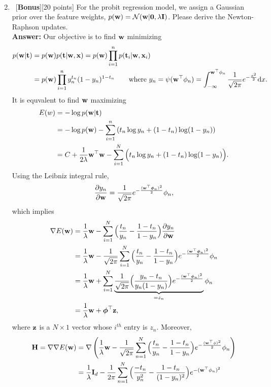 \documentclass[12pt, fullpage,letterpaper]{article}
\def\red{\color{red}}
\def\blackblue{\color{black!40!blue}}
\begin{document}
\begin{enumerate}
{\begin{align*}
	\end{align*} 
	}
\item~[\textbf{Bonus}][20 points]  For the probit regression model, we assign a Gaussian prior over the feature weights,  $p({\bf w}) = \mathcal{N}({\bf w}|{\bf 0}, \lambda{\bf I})$. Please derive the Newton-Raphson updates. \\
	{\bf \red Answer:} {\blackblue Our objective is to find ${\bf w}$ minimizing 
	\begin{align*}
	p({\bf w}|{\bf t}) & = p({\bf w}) p({\bf t}|{\bf w},{\bf x}) = p({\bf w})\prod_{i=1}^n p({\bf t}_i|{\bf w},{\bf x}_i)\\
	& = p({\bf w})\prod_{i=1}^n  y_n^{t_n}(1-y_n)^{1-t_n}\quad\quad\text{where $y_n = \psi({\bf w}^\top \phi_n)=\int_{-\infty}^{{\bf w}^\top \phi_n}\frac{1}{\sqrt{2\pi}}e^{-\frac{x^2}{2}}{\rm d} x.$}
	\end{align*}
	It is equvalent to find ${\bf w}$ maximizing 
	\begin{align*}
	E(w) & = -\log p({\bf w}|{\bf t})\\
	& = -\log p({\bf w}) - \sum_{i=1}^n\left(t_n\log y_n + (1-t_n)\log(1-y_n)\right)  \\
	& = C + \frac{1}{2\lambda}{\bf w}^\top{\bf w} - \sum_{i=1}^N\Big(t_n\log y_n + (1-t_n)\log(1-y_n)\Big).
	\end{align*}
	Using the Leibniz integral rule, 
	$$\frac{\partial  y_n}{\partial {\bf w}} = \frac{1}{\sqrt{2\pi}}e^{-\frac{({\bf w}^\top\boldsymbol{\phi}_n)^2}{2}}\phi_n,$$
	which implies  
	\begin{align*}
	\nabla E({\bf w}) & =\frac{1}{\lambda}{\bf w} - \sum_{i=1}^N \Big(\frac{t_n}{y_n} - \frac{1-t_n}{1-y_n} \Big)\frac{\partial y_n}{\partial {\bf w}}\\
	& =  \frac{1}{\lambda}{\bf w} - \frac{1}{\sqrt{2\pi}}\sum_{i=1}^N \Big(\frac{t_n}{y_n} - \frac{1-t_n}{1-y_n} \Big)e^{-\frac{({\bf w}^\top\boldsymbol{\phi}_n)^2}{2}}\phi_n\\
	& =  \frac{1}{\lambda}{\bf w} + \sum_{i=1}^N \underbrace{\frac{1}{\sqrt{2\pi}}\Big(\frac{y_n-t_n}{y_n(1-y_n)} \Big)e^{-\frac{({\bf w}^\top\boldsymbol{\phi}_n)^2}{2}}}_{=z_n}\phi_n\\
	& =  \frac{1}{\lambda}{\bf w} +\boldsymbol{\phi}^\top{\bf z},	
	\end{align*}
	where ${\bf z}$ is a $N\times 1$ vector whose $i^{th}$ entry is $z_n$. 
	Moreover, 
	\begin{align*}
	\H = \nabla\nabla E(\w) 
	& = \nabla\left( \frac{1}{\lambda}\w- \frac{1}{\sqrt{2\pi}}\sum_{n=1}^N \Big(\frac{t_n}{y_n} - \frac{1-t_n}{1-y_n} \Big)e^{-\frac{(\w^\top\phi)^2}{2}}\phi_n\right)\\
	& = \frac{1}{\lambda}\I_{d} - \frac{1}{2\pi}\sum_{n=1}^N \Big(\frac{-t_n}{y_n^2} - \frac{1-t_n}{(1-y_n)^2} \Big)e^{-(\w^\top\phi_n)^2}

\end{align*}}
\end{enumerate}
\end{document}
